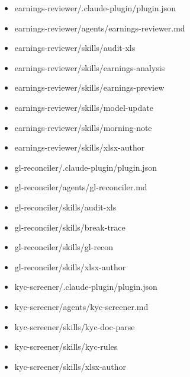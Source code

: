 \documentclass[11pt]{article}
\begin{document}
\begin{itemize}[leftmargin=*,itemsep=1pt,topsep=2pt]
\item \hspace*{1.8em}earnings-reviewer/.claude-plugin/plugin.json
\item \hspace*{1.8em}earnings-reviewer/agents/earnings-reviewer.md
\item \hspace*{1.8em}earnings-reviewer/skills/audit-xls
\item \hspace*{1.8em}earnings-reviewer/skills/earnings-analysis
\item \hspace*{1.8em}earnings-reviewer/skills/earnings-preview
\item \hspace*{1.8em}earnings-reviewer/skills/model-update
\item \hspace*{1.8em}earnings-reviewer/skills/morning-note
\item \hspace*{1.8em}earnings-reviewer/skills/xlsx-author
\item \hspace*{1.8em}gl-reconciler/.claude-plugin/plugin.json
\item \hspace*{1.8em}gl-reconciler/agents/gl-reconciler.md
\item \hspace*{1.8em}gl-reconciler/skills/audit-xls
\item \hspace*{1.8em}gl-reconciler/skills/break-trace
\item \hspace*{1.8em}gl-reconciler/skills/gl-recon
\item \hspace*{1.8em}gl-reconciler/skills/xlsx-author
\item \hspace*{1.8em}kyc-screener/.claude-plugin/plugin.json
\item \hspace*{1.8em}kyc-screener/agents/kyc-screener.md
\item \hspace*{1.8em}kyc-screener/skills/kyc-doc-parse
\item \hspace*{1.8em}kyc-screener/skills/kyc-rules
\item \hspace*{1.8em}kyc-screener/skills/xlsx-author

\end{itemize}
\end{document}
